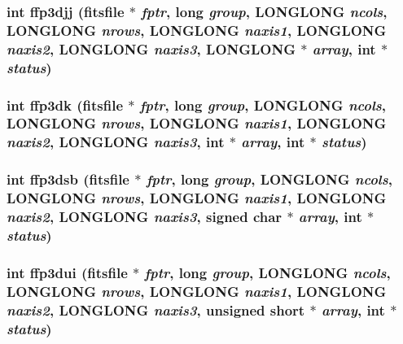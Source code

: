 \subsubsection{\setlength{\rightskip}{0pt plus 5cm}int ffp3djj (\bf{fitsfile} $\ast$ {\em fptr}, long {\em group}, \bf{LONGLONG} {\em ncols}, \bf{LONGLONG} {\em nrows}, \bf{LONGLONG} {\em naxis1}, \bf{LONGLONG} {\em naxis2}, \bf{LONGLONG} {\em naxis3}, \bf{LONGLONG} $\ast$ {\em array}, int $\ast$ {\em status})}\label{test_2shm__client_2fitsio_8h_4b7964ba335cd471910d79a4055aeb1d}


\subsubsection{\setlength{\rightskip}{0pt plus 5cm}int ffp3dk (\bf{fitsfile} $\ast$ {\em fptr}, long {\em group}, \bf{LONGLONG} {\em ncols}, \bf{LONGLONG} {\em nrows}, \bf{LONGLONG} {\em naxis1}, \bf{LONGLONG} {\em naxis2}, \bf{LONGLONG} {\em naxis3}, int $\ast$ {\em array}, int $\ast$ {\em status})}\label{test_2shm__client_2fitsio_8h_e695cca6e553d21f86ee71051783c338}


\subsubsection{\setlength{\rightskip}{0pt plus 5cm}int ffp3dsb (\bf{fitsfile} $\ast$ {\em fptr}, long {\em group}, \bf{LONGLONG} {\em ncols}, \bf{LONGLONG} {\em nrows}, \bf{LONGLONG} {\em naxis1}, \bf{LONGLONG} {\em naxis2}, \bf{LONGLONG} {\em naxis3}, signed char $\ast$ {\em array}, int $\ast$ {\em status})}\label{test_2shm__client_2fitsio_8h_0f9d96f6b290622b85f3dca6c11ea791}


\subsubsection{\setlength{\rightskip}{0pt plus 5cm}int ffp3dui (\bf{fitsfile} $\ast$ {\em fptr}, long {\em group}, \bf{LONGLONG} {\em ncols}, \bf{LONGLONG} {\em nrows}, \bf{LONGLONG} {\em naxis1}, \bf{LONGLONG} {\em naxis2}, \bf{LONGLONG} {\em naxis3}, unsigned short $\ast$ {\em array}, int $\ast$ {\em status})}\label{test_2shm__client_2fitsio_8h_1dd3e0662151506b0470d7348493663d}


